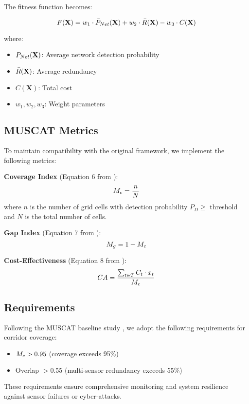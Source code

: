 The fitness function becomes:

\begin{equation}
F(\textbf{X}) = w_1 \cdot \bar{P}_{Net}(\textbf{X}) + w_2 \cdot \bar{R}(\textbf{X}) - w_3 \cdot C(\textbf{X})
\label{eq:fitness}
\end{equation}

where:
\begin{itemize}
\item $\bar{P}_{Net}(\textbf{X})$: Average network detection probability
\item $\bar{R}(\textbf{X})$: Average redundancy
\item $C(\textbf{X})$: Total cost
\item $w_1, w_2, w_3$: Weight parameters
\end{itemize}

\subsection{MUSCAT Metrics}

To maintain compatibility with the original framework, we implement the following metrics:

\textbf{Coverage Index} (Equation 6 from \cite{muscat2023}):
\begin{equation}
M_c = \frac{n}{N}
\label{eq:coverage_index}
\end{equation}
where $n$ is the number of grid cells with detection probability $P_D \geq$ threshold and $N$ is the total number of cells.

\textbf{Gap Index} (Equation 7 from \cite{muscat2023}):
\begin{equation}
M_g = 1 - M_c
\label{eq:gap_index}
\end{equation}

\textbf{Cost-Effectiveness} (Equation 8 from \cite{muscat2023}):
\begin{equation}
CA = \frac{\sum_{t \in T} C_t \cdot x_t}{M_c}
\label{eq:cost_effectiveness}
\end{equation}

\subsection{Requirements}

Following the MUSCAT baseline study \cite{muscat2023}, we adopt the following requirements for corridor coverage:

\begin{itemize}
\item $M_c > 0.95$ (coverage exceeds 95\%)
\item Overlap $> 0.55$ (multi-sensor redundancy exceeds 55\%)
\end{itemize}

These requirements ensure comprehensive monitoring and system resilience against sensor failures or cyber-attacks.


